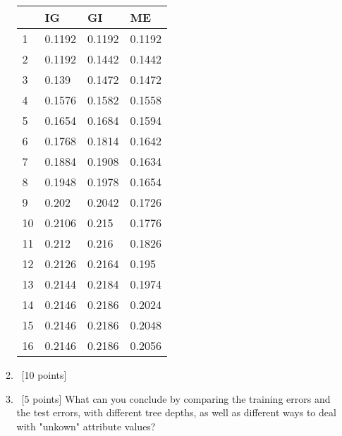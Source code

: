 \documentclass[12pt, fullpage,letterpaper]{article}
\begin{document}
\begin{enumerate}
\begin{enumerate}
\begin{tabular}{|l|l|l|l|}
			\hline
			   & IG & GI & ME \\ \hline
			1  & 0.1192           & 0.1192     & 0.1192         \\ \hline
			2  & 0.1192           & 0.1442     & 0.1442         \\ \hline
			3  & 0.139            & 0.1472     & 0.1472         \\ \hline
			4  & 0.1576           & 0.1582     & 0.1558         \\ \hline
			5  & 0.1654           & 0.1684     & 0.1594         \\ \hline
			6  & 0.1768           & 0.1814     & 0.1642         \\ \hline
			7  & 0.1884           & 0.1908     & 0.1634         \\ \hline
			8  & 0.1948           & 0.1978     & 0.1654         \\ \hline
			9  & 0.202            & 0.2042     & 0.1726         \\ \hline
			10 & 0.2106           & 0.215      & 0.1776         \\ \hline
			11 & 0.212            & 0.216      & 0.1826         \\ \hline
			12 & 0.2126           & 0.2164     & 0.195          \\ \hline
			13 & 0.2144           & 0.2184     & 0.1974         \\ \hline
			14 & 0.2146           & 0.2186     & 0.2024         \\ \hline
			15 & 0.2146           & 0.2186     & 0.2048         \\ \hline
			16 & 0.2146           & 0.2186     & 0.2056         \\ \hline
			\end{tabular}
	\item~[10 points] 
	
	
	\item~[5 points] What can you conclude by comparing the training errors and the test errors, with different tree depths, as well as different ways to deal with "unkown" attribute values?
\end{enumerate}
\end{enumerate}
\end{document}
